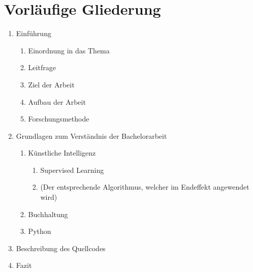 \documentclass[hidelinks,12pt,a4paper]{article}
\begin{document}
\section{Vorläufige Gliederung}
\begin{enumerate}
	\item Einführung
	\begin{enumerate}
		\item Einordnung in das Thema 
		\item Leitfrage
		\item Ziel der Arbeit 
		\item Aufbau der Arbeit
		\item Forschungsmethode 
	\end{enumerate}


	\item Grundlagen zum Verständnis der Bachelorarbeit 
	\begin{enumerate}
		\item Künstliche Intelligenz
		\begin{enumerate}
			\item Supervised Learning 
			\item (Der entsprechende Algorithmus, welcher im Endeffekt angewendet wird)
		\end{enumerate}
		\item Buchhaltung 
		\item Python
	\end{enumerate}
	
	\item Beschreibung des Quellcodes 
	\item Fazit
\end{enumerate}

\newpage
\end{document}
